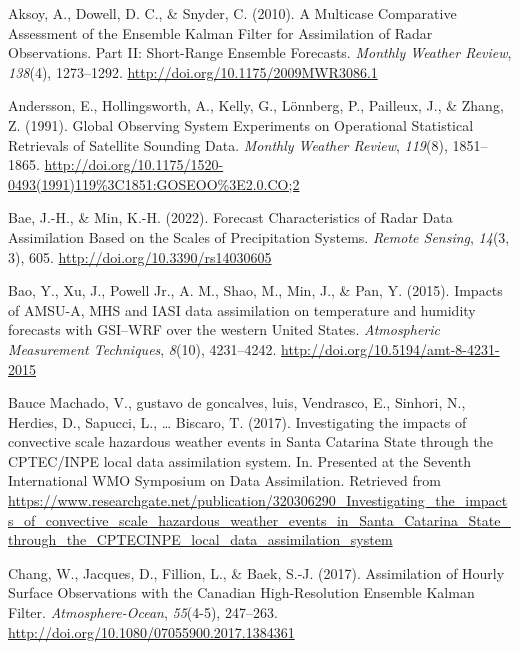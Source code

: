 \documentclass[12pt,twoside]{reedthesis}
\begin{document}
\setlength{\parindent}{-0.20in}

\hypertarget{refs}{}
\leavevmode\hypertarget{ref-aksoy2010}{}%
Aksoy, A., Dowell, D. C., \& Snyder, C. (2010). A Multicase Comparative Assessment of the Ensemble Kalman Filter for Assimilation of Radar Observations. Part II: Short-Range Ensemble Forecasts. \emph{Monthly Weather Review}, \emph{138}(4), 1273--1292. \url{http://doi.org/10.1175/2009MWR3086.1}

\leavevmode\hypertarget{ref-andersson1991}{}%
Andersson, E., Hollingsworth, A., Kelly, G., Lönnberg, P., Pailleux, J., \& Zhang, Z. (1991). Global Observing System Experiments on Operational Statistical Retrievals of Satellite Sounding Data. \emph{Monthly Weather Review}, \emph{119}(8), 1851--1865. \url{http://doi.org/10.1175/1520-0493(1991)119\%3C1851:GOSEOO\%3E2.0.CO;2}

\leavevmode\hypertarget{ref-bae2022}{}%
Bae, J.-H., \& Min, K.-H. (2022). Forecast Characteristics of Radar Data Assimilation Based on the Scales of Precipitation Systems. \emph{Remote Sensing}, \emph{14}(3, 3), 605. \url{http://doi.org/10.3390/rs14030605}

\leavevmode\hypertarget{ref-bao2015}{}%
Bao, Y., Xu, J., Powell Jr., A. M., Shao, M., Min, J., \& Pan, Y. (2015). Impacts of AMSU-A, MHS and IASI data assimilation on temperature and humidity forecasts with GSI--WRF over the western United States. \emph{Atmospheric Measurement Techniques}, \emph{8}(10), 4231--4242. \url{http://doi.org/10.5194/amt-8-4231-2015}

\leavevmode\hypertarget{ref-baucemachado2017}{}%
Bauce Machado, V., gustavo de goncalves, luis, Vendrasco, E., Sinhori, N., Herdies, D., Sapucci, L., \ldots{} Biscaro, T. (2017). Investigating the impacts of convective scale hazardous weather events in Santa Catarina State through the CPTEC/INPE local data assimilation system. In. Presented at the Seventh International WMO Symposium on Data Assimilation. Retrieved from \url{https://www.researchgate.net/publication/320306290_Investigating_the_impacts_of_convective_scale_hazardous_weather_events_in_Santa_Catarina_State_through_the_CPTECINPE_local_data_assimilation_system}

\leavevmode\hypertarget{ref-chang2017}{}%
Chang, W., Jacques, D., Fillion, L., \& Baek, S.-J. (2017). Assimilation of Hourly Surface Observations with the Canadian High-Resolution Ensemble Kalman Filter. \emph{Atmosphere-Ocean}, \emph{55}(4-5), 247--263. \url{http://doi.org/10.1080/07055900.2017.1384361}
\end{document}
